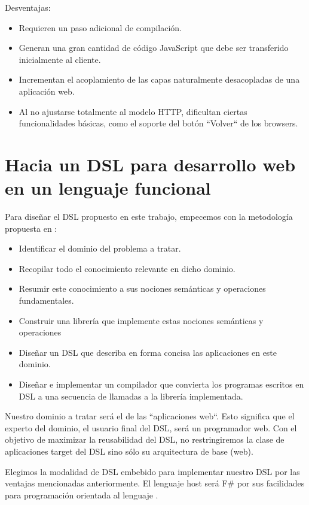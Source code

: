 \documentclass[12pt]{report}
\begin{document}
Desventajas:

\begin{itemize}
	\item Requieren un paso adicional de compilación.
	\item Generan una gran cantidad de código JavaScript que debe ser transferido inicialmente al cliente.
	\item Incrementan el acoplamiento de las capas naturalmente desacopladas de una aplicación web.
	\item Al no ajustarse totalmente al modelo HTTP, dificultan ciertas funcionalidades básicas, como el soporte del botón ``Volver`` de los browsers.
\end{itemize}

\chapter{Hacia un DSL para desarrollo web en un lenguaje funcional}

Para diseñar el DSL propuesto en este trabajo, empecemos con la metodología propuesta en \cite{van1998little}:

\begin{itemize}
	\item Identificar el dominio del problema a tratar.
	\item Recopilar todo el conocimiento relevante en dicho dominio.
	\item Resumir este conocimiento a sus nociones semánticas y operaciones fundamentales.
	\item Construir una librería que implemente estas nociones semánticas y operaciones
	\item Diseñar un DSL que describa en forma concisa las aplicaciones en este dominio.
	\item Diseñar e implementar un compilador que convierta los programas escritos en DSL a una secuencia de llamadas a la librería implementada.
\end{itemize}

Nuestro dominio a tratar será el de las ``aplicaciones web``. Esto significa que el experto del dominio, el usuario final del DSL, será un programador web. Con el objetivo de maximizar la reusabilidad del DSL, no restringiremos la clase de aplicaciones target del DSL sino sólo su arquitectura de base (web). 

Elegimos la modalidad de DSL embebido para implementar nuestro DSL por las ventajas mencionadas anteriormente. El lenguaje host será F\# por sus facilidades para programación orientada al lenguaje \cite{syme2007expert} \cite{pickering2007foundations} \cite{smith-lop} \cite{petricek-lop}.
\end{document}
